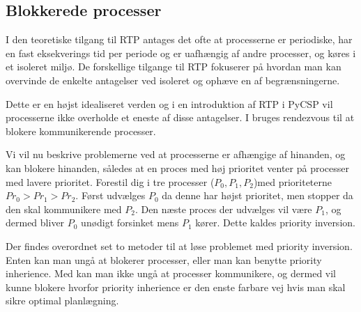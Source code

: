\begin{shaded}
\subsection{Blokkerede processer}
I den teoretiske tilgang til RTP antages det ofte at processerne er periodiske, har en fast eksekverings tid per periode og er uafhængig af andre processer, og køres i et isoleret miljø. De forskellige tilgange til RTP fokuserer på hvordan man kan overvinde de enkelte antagelser ved isoleret og ophæve en af begrænsningerne. 


Dette er en højst idealiseret verden og i en introduktion af RTP i PyCSP vil processerne ikke overholde et eneste af disse antagelser. 
I \pycsp bruges rendezvous til at blokere kommunikerende processer.

Vi vil nu beskrive problemerne ved at processerne er afhængige af hinanden, og kan blokere hinanden, således at en proces med høj prioritet venter på processer med lavere prioritet. Forestil dig i \pycsp tre processer ($P_0,P_1,P_2$)med prioriteterne $Pr_0>Pr_1>Pr_2$. Først udvælges $P_0$ da denne har højst prioritet, men stopper da den skal kommunikere med $P_2$. Den næste proces der udvælges vil være $P_1$, og dermed bliver $P_0$ unødigt forsinket mens $P_1$ kører. Dette kaldes priority inversion\cite{sha1990priority}.

Der findes overordnet set to metoder til at løse problemet med priority inversion. Enten kan man ungå at blokerer processer, eller man kan benytte priority inherience\cite{sha1990priority}. Med \pycsp kan man ikke ungå at processer kommunikere, og dermed vil kunne blokere hvorfor priority inherience er den enste farbare vej hvis man skal sikre optimal planlægning.
\end{shaded}


